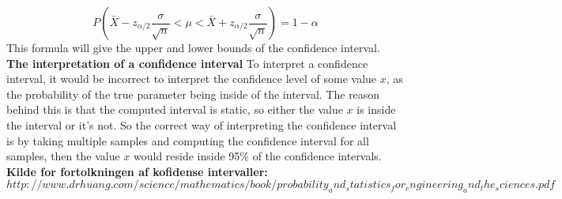$$P(\bar{X}-z_{\alpha/2}\frac{\sigma}{\sqrt{n}}<\mu<\bar{X}+z_{\alpha/2}\frac{\sigma}{\sqrt{n}})=1-\alpha$$
\newline
This formula will give the upper and lower bounds of the confidence interval.\\

\noindent \textbf{The interpretation of a confidence interval}
\newline
To interpret a confidence interval, it would be incorrect to interpret the confidence level of some value $x$, as the probability of the true parameter being inside of the interval. The reason behind this is that the computed interval is static, so either the value $x$ is inside the interval or it's not. So the correct way of interpreting the confidence interval is by taking multiple samples and computing the confidence interval for all samples, then the value $x$ would reside inside 95\% of the confidence intervals.
\textbf{Kilde for fortolkningen af kofidense intervaller:}
\newline
$http://www.drhuang.com/science/mathematics/book/probability_and_statistics_for_engineering_and_the_sciences.pdf$